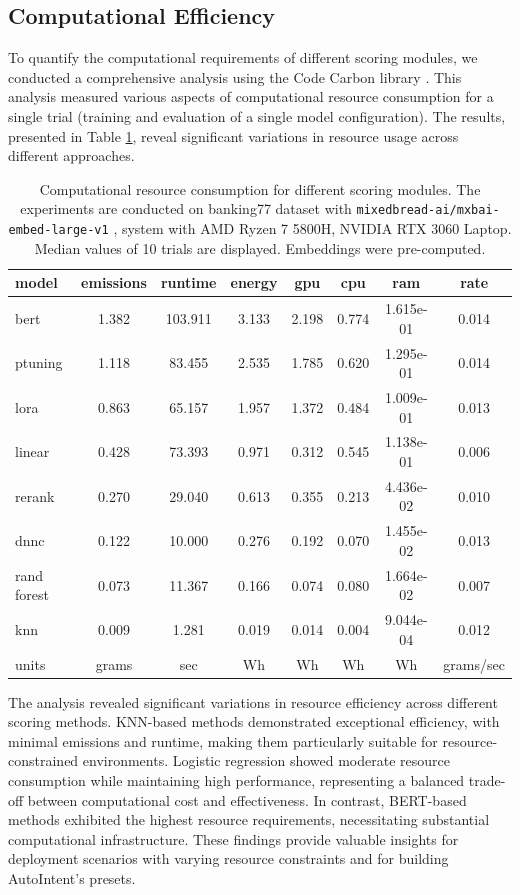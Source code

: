 \subsection{Computational Efficiency}

To quantify the computational requirements of different scoring modules, we conducted a comprehensive analysis using the Code Carbon library \cite{benoit_courty_2024_11171501}. This analysis measured various aspects of computational resource consumption for a single trial (training and evaluation of a single model configuration). The results, presented in Table \ref{tab:computational}, reveal significant variations in resource usage across different approaches.

\begin{table}[h]
\centering
\begin{tabular}{l|ccccccc}
\toprule
model & emissions & runtime & energy & gpu & cpu & ram & rate \\
\midrule
bert & 1.382 & 103.911 & 3.133 & 2.198 & 0.774 & 1.615e-01 & 0.014 \\
ptuning & 1.118 & 83.455 & 2.535 & 1.785 & 0.620 & 1.295e-01 & 0.014 \\
lora & 0.863 & 65.157 & 1.957 & 1.372 & 0.484 & 1.009e-01 & 0.013 \\
linear & 0.428 & 73.393 & 0.971 & 0.312 & 0.545 & 1.138e-01 & 0.006 \\
rerank & 0.270 & 29.040 & 0.613 & 0.355 & 0.213 & 4.436e-02 & 0.010 \\
dnnc & 0.122 & 10.000 & 0.276 & 0.192 & 0.070 & 1.455e-02 & 0.013 \\
rand forest & 0.073 & 11.367 & 0.166 & 0.074 & 0.080 & 1.664e-02 & 0.007 \\
knn & 0.009 & 1.281 & 0.019 & 0.014 & 0.004 & 9.044e-04 & 0.012 \\
\midrule
units & grams & sec & Wh & Wh & Wh & Wh & grams/sec \\
\bottomrule
\end{tabular}
\caption{Computational resource consumption for different scoring modules. The experiments are conducted on banking77 dataset with \texttt{mixedbread-ai/mxbai-embed-large-v1} \cite{emb2024mxbai,li2023angle}, system with AMD Ryzen 7 5800H, NVIDIA RTX 3060 Laptop. Median values of 10 trials are displayed. Embeddings were pre-computed.}
\label{tab:computational}
\end{table}

The analysis revealed significant variations in resource efficiency across different scoring methods. KNN-based methods demonstrated exceptional efficiency, with minimal emissions and runtime, making them particularly suitable for resource-constrained environments. Logistic regression showed moderate resource consumption while maintaining high performance, representing a balanced trade-off between computational cost and effectiveness. In contrast, BERT-based methods exhibited the highest resource requirements, necessitating substantial computational infrastructure. These findings provide valuable insights for deployment scenarios with varying resource constraints and for building AutoIntent's presets.

